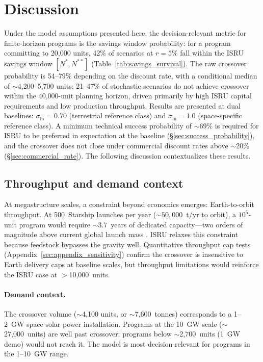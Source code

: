 \documentclass[preprint,12pt]{elsarticle}
\begin{document}
\section{Discussion}
\label{sec:discussion}

Under the model assumptions presented here, the decision-relevant metric for finite-horizon programs is the savings window probability: for a program committing to 20{,}000 units, 42\% of scenarios at $r = 5\%$ fall within the ISRU savings window $[N^*, N^{**}]$ (Table~\ref{tab:savings_survival}). The raw crossover probability is 54--79\% depending on the discount rate, with a conditional median of $\sim$4{,}200--5{,}700 units; 21--47\% of stochastic scenarios do not achieve crossover within the 40{,}000-unit planning horizon, driven primarily by high ISRU capital requirements and low production throughput. Results are presented at dual baselines: $\sigma_{\ln} = 0.70$ (terrestrial reference class) and $\sigma_{\ln} = 1.0$ (space-specific reference class). A minimum technical success probability of $\sim$69\% is required for ISRU to be preferred in expectation at the baseline (\S\ref{sec:success_probability}), and the crossover does not close under commercial discount rates above $\sim$20\% (\S\ref{sec:commercial_rate}). The following discussion contextualizes these results.

\subsection{Throughput and demand context}
\label{sec:throughput}

At megastructure scales, a constraint beyond economics emerges: Earth-to-orbit throughput. At 500~Starship launches per year (${\sim}50{,}000$~t/yr to orbit), a $10^5$-unit program would require ${\sim}3.7$~years of dedicated capacity---two orders of magnitude above current global launch mass \cite{jones2022}. ISRU relaxes this constraint because feedstock bypasses the gravity well. Quantitative throughput cap tests (Appendix~\ref{sec:appendix_sensitivity}) confirm the crossover is insensitive to Earth delivery caps at baseline scales, but throughput limitations would reinforce the ISRU case at $>$10{,}000~units.

\paragraph{Demand context.} The crossover volume ($\sim$4,100 units, or $\sim$7,600~tonnes) corresponds to a 1--2~GW space solar power installation. Programs at the 10~GW scale ($\sim$27,000~units) are well past crossover; programs below $\sim$2,700~units (1~GW demo) would not reach it. The model is most decision-relevant for programs in the 1--10~GW range.
\end{document}
